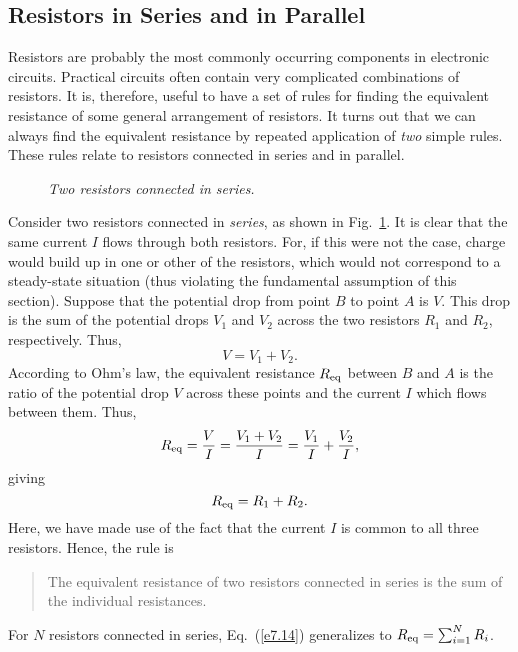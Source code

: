 \subsection{Resistors in Series and in Parallel}
Resistors are probably  the most commonly occurring 
components in  electronic circuits. 
Practical circuits often contain very complicated combinations of resistors.
It is, therefore, useful to have a set of rules for finding the equivalent
resistance of some general arrangement of resistors. It turns out that we can
always find the equivalent resistance by repeated application of
{\em two}\/ simple rules. These rules relate to resistors connected in series and
in parallel.

\begin{figure}
\epsfysize=1.25in
\centerline{}
\caption{\em Two resistors connected in series.}\label{f7.2}
\end{figure}

Consider two resistors connected in {\em series}, as shown in Fig.~\ref{f7.2}.
It is clear that the same current $I$ flows through both  resistors.
For, if this were not the case, charge would build up in one or other
of the resistors, which would not correspond to
 a steady-state situation (thus violating
the fundamental assumption of this section). Suppose that the potential drop
from point $B$ to point $A$ is $V$. This drop is the sum of the potential
drops $V_1$ and $V_2$ across the two resistors $R_1$ and $R_2$, respectively.
Thus,
\begin{equation}
V = V_1 + V_2.
\end{equation}
According to Ohm's law, the equivalent   resistance $R_{\rm eq}$ between
 $B$ and $A$ is the ratio of the potential drop $V$ across these points
and the current $I$ which flows between them. Thus,
\begin{equation}
R_{\rm eq} = \frac{V}{I} = \frac{V_1+V_2}{I} = \frac{V_1}{I} + \frac{V_2}{I},
\end{equation}
giving
\begin{equation}\label{e7.14}
R_{\rm eq} = R_1 + R_2.
\end{equation}
Here, we have made use of the fact that the current $I$ is common to
all three resistors. Hence, the rule is
\begin{quote}
{\sf The equivalent resistance of two resistors connected in series is the
sum of the individual resistances.}
\end{quote}
For $N$ resistors connected in series, Eq.~(\ref{e7.14}) generalizes
to $R_{\rm eq} = \sum_{i=1}^N R_i$. 

